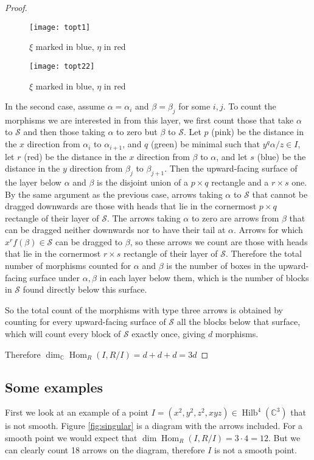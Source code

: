 \documentclass[a4page]{article}
\def\Hilb{\operatorname{Hilb}}
\def\Hom{\operatorname{Hom}}
\theoremstyle{definition}
\def\S{\mathcal{S}}
\begin{document}
\begin{proof}
\begin{figure}
\centering
\texttt{[image: topt1]}
\caption{$\xi$ marked in blue, $\eta$ in red}
\label{fig:topt1}
\end{figure}

\begin{figure}
\centering
\texttt{[image: topt22]}
\caption{$\xi$ marked in blue, $\eta$ in red}
\label{fig:topt2}
\end{figure}

In the second case, assume $\alpha = \alpha_i$ and $\beta=\beta_j$ for some $i,j$.
To count the morphisms we are interested in from this layer,
we first count those that take $\alpha$ to $\S$ and then those taking $\alpha$ to zero but $\beta$ to $\S$.
Let $p$ (pink) be the distance in the $x$ direction from $\alpha_i$ to $\alpha_{i+1}$, and $q$ (green) be minimal such that  $y^{q}\alpha/z \in I$,
let $r$ (red) be the distance in the $x$ direction from $\beta$ to $\alpha$, and let $s$ (blue) be the distance in the $y$ direction from $\beta_j$ to $\beta_{j+1}$.
Then the upward-facing surface of the layer below $\alpha$ and $\beta$ is the disjoint union of a $p \times q$ rectangle and a $r \times s$ one.
By the same argument as the previous case, arrows taking $\alpha$ to $\S$ that cannot be dragged downwards are those with heads that lie in the
cornermost $p \times q$ rectangle of their layer of $\S$.
The arrows taking $\alpha$ to zero are arrows from $\beta$ that can be dragged neither downwards nor to have their tail at $\alpha$.
Arrows for which $x^rf(\beta) \in \S$ can be dragged to $\beta$, so these arrows we count are those with heads that lie in
the cornermost $r \times s$ rectangle of their layer of $\S$.
Therefore the total number of morphisms counted for $\alpha$ and $\beta$ is
the number of boxes in the upward-facing surface under $\alpha,\beta$ in each layer below them, which is the number of blocks in $\S$ found directly below this surface.

So the total count of the morphisms with type three arrows is obtained by counting for every upward-facing surface of $\S$ all the blocks below that surface,
which will count every block of $\S$ exactly once, giving $d$ morphisms.

Therefore $\dim_{\mathbb{C}} \Hom_R(I,R/I)=d+d+d=3d$
\end{proof}

\subsection{Some examples}
First we look at an example of a point $ I = (x^2,y^2,z^2,xyz) \in \Hilb^{4}(\mathbb{C}^{3})$ that is not smooth.
Figure \ref{fig:singular} is a diagram with the arrows included.
For a smooth point we would expect that $ \dim \Hom_{R}(I,R/I) = 3 \cdot 4 = 12 $.
But we can clearly count 18 arrows on the diagram, therefore $I$ is not a smooth point.
\\ \\
\end{document}
